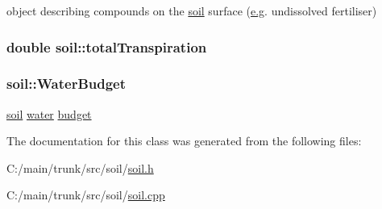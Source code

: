 object describing compounds on the \hyperlink{classsoil}{soil} surface (\hyperlink{typer_8h_ae4c405e5c68c6ec2c44bb6d6adfc2f6ca35c0bb7088830963c73dcf0470ab8922}{e.g}. undissolved fertiliser) \hypertarget{classsoil_a7b54d79b2b2742e3a173c49e76a797c9}{
\subsubsection[{totalTranspiration}]{\setlength{\rightskip}{0pt plus 5cm}double {\bf soil::totalTranspiration}}}
\label{classsoil_a7b54d79b2b2742e3a173c49e76a797c9}
\hypertarget{classsoil_a5fc83b89b81299ab7cde864a78092279}{
\subsubsection[{WaterBudget}]{ {\bf soil::WaterBudget}}}
\label{classsoil_a5fc83b89b81299ab7cde864a78092279}


\hyperlink{classsoil}{soil} \hyperlink{classwater}{water} \hyperlink{classbudget}{budget} 

The documentation for this class was generated from the following files:\begin{DoxyCompactItemize}
\item 
C:/main/trunk/src/soil/\hyperlink{soil_8h}{soil.h}\item 
C:/main/trunk/src/soil/\hyperlink{soil_8cpp}{soil.cpp}\end{DoxyCompactItemize}
